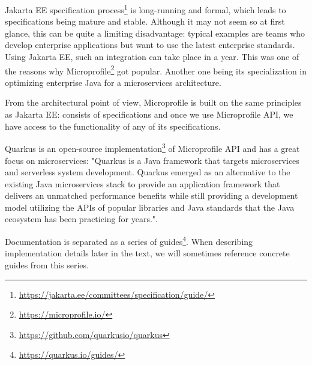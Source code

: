 \documentclass[../main.tex]{subfiles}
\begin{document}
Jakarta EE specification process\footnote{\url{https://jakarta.ee/committees/specification/guide/}} is long-running and formal, which leads to specifications being mature and stable. Although it may not seem so at first glance, this can be quite a limiting disadvantage: typical examples are teams who develop enterprise applications but want to use the latest enterprise standards. Using Jakarta EE, such an integration can take place in a year. This was one of the reasons why Microprofile\footnote{\url{https://microprofile.io/}} got popular. Another one being its specialization in optimizing enterprise Java for a microservices architecture.

From the architectural point of view, Microprofile is built on the same principles as Jakarta EE: consists of specifications and once we use Microprofile API, we have access to the functionality of any of its specifications.

Quarkus is an open-source implementation\footnote{\url{https://github.com/quarkusio/quarkus}} of Microprofile API and has a great focus on microservices: "Quarkus is a Java framework that targets microservices and serverless system
development. Quarkus emerged as an alternative to the existing Java
microservices stack to provide an application framework that delivers an
unmatched performance benefits while still providing a development model
utilizing the APIs of popular libraries
and Java standards that the Java ecosystem has been practicing for years."\cite{quarkusinaction}\cite{quarkusBook}.

Documentation is separated as a series of guides\footnote{\url{https://quarkus.io/guides/}}. When describing implementation details later in the text, we will sometimes reference concrete guides from this series.
\end{document}
